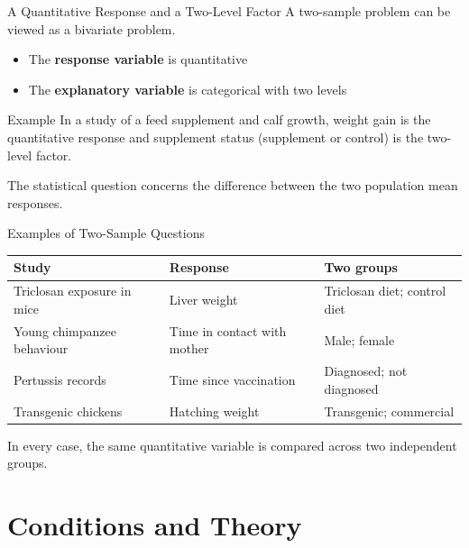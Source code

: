 \documentclass[aspectratio=169,10pt]{beamer}
\begin{document}
\begin{frame}{A Quantitative Response and a Two-Level Factor}
A two-sample problem can be viewed as a bivariate problem.

\begin{itemize}
  \item The \textbf{response variable} is quantitative
  \item The \textbf{explanatory variable} is categorical with two levels
\end{itemize}

\begin{block}{Example}
In a study of a feed supplement and calf growth, weight gain is the quantitative response and supplement status (supplement or control) is the two-level factor.
\end{block}

The statistical question concerns the difference between the two population mean responses.
\end{frame}

\begin{frame}{Examples of Two-Sample Questions}
\small
\begin{center}
\begin{tabularx}{0.95\textwidth}{>{\RaggedRight\arraybackslash}p{} X X}
\toprule
\textbf{Study} & \textbf{Response} & \textbf{Two groups} \\
\midrule
Triclosan exposure in mice & Liver weight & Triclosan diet; control diet \\
Young chimpanzee behaviour & Time in contact with mother & Male; female \\
Pertussis records & Time since vaccination & Diagnosed; not diagnosed \\
Transgenic chickens & Hatching weight & Transgenic; commercial \\
\bottomrule
\end{tabularx}
\end{center}

In every case, the same quantitative variable is compared across two independent groups.
\end{frame}


\section{Conditions and Theory}
\end{document}

